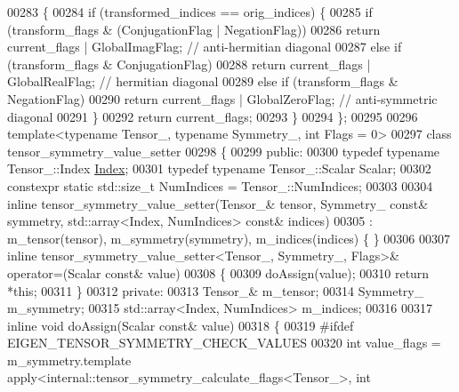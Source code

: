 \begin{DoxyCode}
00283   \{
00284     \textcolor{keywordflow}{if} (transformed\_indices == orig\_indices) \{
00285       \textcolor{keywordflow}{if} (transform\_flags & (ConjugationFlag | NegationFlag))
00286         \textcolor{keywordflow}{return} current\_flags | GlobalImagFlag; \textcolor{comment}{// anti-hermitian diagonal}
00287       \textcolor{keywordflow}{else} \textcolor{keywordflow}{if} (transform\_flags & ConjugationFlag)
00288         \textcolor{keywordflow}{return} current\_flags | GlobalRealFlag; \textcolor{comment}{// hermitian diagonal}
00289       \textcolor{keywordflow}{else} \textcolor{keywordflow}{if} (transform\_flags & NegationFlag)
00290         \textcolor{keywordflow}{return} current\_flags | GlobalZeroFlag; \textcolor{comment}{// anti-symmetric diagonal}
00291     \}
00292     \textcolor{keywordflow}{return} current\_flags;
00293   \}
00294 \};
00295 
00296 \textcolor{keyword}{template}<\textcolor{keyword}{typename} Tensor\_, \textcolor{keyword}{typename} Symmetry\_, \textcolor{keywordtype}{int} Flags = 0>
00297 \textcolor{keyword}{class }tensor\_symmetry\_value\_setter
00298 \{
00299   \textcolor{keyword}{public}:
00300     \textcolor{keyword}{typedef} \textcolor{keyword}{typename} Tensor\_::Index \hyperlink{namespace_eigen_a62e77e0933482dafde8fe197d9a2cfde}{Index};
00301     \textcolor{keyword}{typedef} \textcolor{keyword}{typename} Tensor\_::Scalar Scalar;
00302     constexpr \textcolor{keyword}{static} std::size\_t NumIndices = Tensor\_::NumIndices;
00303 
00304     \textcolor{keyword}{inline} tensor\_symmetry\_value\_setter(Tensor\_& tensor, Symmetry\_ \textcolor{keyword}{const}& symmetry, std::array<Index,
       NumIndices> \textcolor{keyword}{const}& indices)
00305       : m\_tensor(tensor), m\_symmetry(symmetry), m\_indices(indices) \{ \}
00306 
00307     \textcolor{keyword}{inline} tensor\_symmetry\_value\_setter<Tensor\_, Symmetry\_, Flags>& operator=(Scalar \textcolor{keyword}{const}& value)
00308     \{
00309       doAssign(value);
00310       \textcolor{keywordflow}{return} *\textcolor{keyword}{this};
00311     \}
00312   \textcolor{keyword}{private}:
00313     Tensor\_& m\_tensor;
00314     Symmetry\_ m\_symmetry;
00315     std::array<Index, NumIndices> m\_indices;
00316 
00317     \textcolor{keyword}{inline} \textcolor{keywordtype}{void} doAssign(Scalar \textcolor{keyword}{const}& value)
00318     \{
00319 \textcolor{preprocessor}{      #ifdef EIGEN\_TENSOR\_SYMMETRY\_CHECK\_VALUES}
00320         \textcolor{keywordtype}{int} value\_flags = m\_symmetry.template apply<internal::tensor\_symmetry\_calculate\_flags<Tensor\_>, \textcolor{keywordtype}{int}

\end{DoxyCode}

